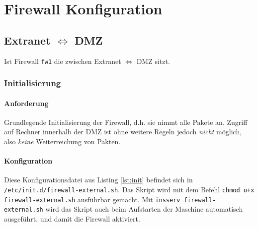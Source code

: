 \section{Firewall Konfiguration}

\subsection{Extranet $\Longleftrightarrow$ DMZ}

Ist Firewall {\tt fw1} die zwischen Extranet $\Longleftrightarrow$ DMZ sitzt.


\subsubsection{Initialisierung}

\paragraph{Anforderung} Grundlegende Initialisierung der Firewall, d.h.
sie nimmt alle Pakete an. Zugriff auf Rechner innerhalb der DMZ ist ohne
weitere Regeln jedoch \emph{nicht} möglich, also \emph{keine} Weiterreichung von
Pakten.

\paragraph{Konfiguration} Diese Konfigurationsdatei aus Listing \ref{lst:init}
befindet sich in {\tt /etc/init.d/firewall-external.sh}.
Das Skript wird mit dem Befehl {\tt chmod u+x firewall-external.sh}
ausführbar gemacht. Mit {\tt insserv firewall-external.sh}
wird das Skript auch beim Aufstarten der Maschine automatisch ausgeführt,
und damit die Firewall aktiviert.


